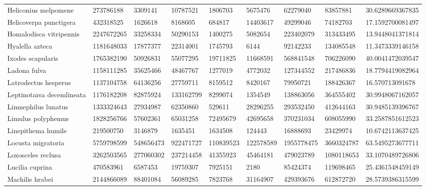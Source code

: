 \begin{table}[]
\begin{tabular}{@{}lllllllll@{}}
Heliconius melpomene       & 273786188   & 3309141   & 10787521  & 1806703   & 5675476   & 62279040   & 83857881   & 30.6289669367835  \\
Helicoverpa punctigera     & 432318525   & 1626618   & 8168605   & 684817    & 14403617  & 49299046   & 74182703   & 17.1592700081497  \\
Homalodisca vitripennis    & 2247672265  & 33258334  & 50290153  & 1400275   & 5082654   & 223402079  & 313433495  & 13.9448041371814  \\
Hyalella azteca            & 1181648033  & 17877377  & 22314001  & 1745793   & 6144      & 92142233   & 134085548  & 11.3473339146158  \\
Ixodes scapularis          & 1765382190  & 50926831  & 55077295  & 19711825  & 11668591  & 568841548  & 706226090  & 40.0041472039547  \\
Ladona fulva               & 1158111285  & 35625466  & 48467767  & 1277019   & 4772032   & 127344552  & 217486836  & 18.7794419082964  \\
Latrodectus hesperus       & 1137104758  & 64136256  & 27759711  & 8159512   & 8420167   & 79950721   & 188426367  & 16.570713091678   \\
Leptinotarsa decemlineata  & 1176182208  & 82875924  & 133162799 & 8299074   & 1354549   & 138863056  & 364555402  & 30.9948067162057  \\
Limnephilus lunatus        & 1333324643  & 27934987  & 62350860  & 529611    & 28296255  & 293532450  & 412644163  & 30.9485139396767  \\
Limulus polyphemus         & 1828256766  & 57602361  & 65031258  & 72495679  & 42695658  & 370231034  & 608055990  & 33.2587851612523  \\
Linepithema humile         & 219500750   & 3146879   & 1635451   & 1634508   & 124443    & 16888693   & 23429974   & 10.6742113637425  \\
Locusta migratoria         & 5759798599  & 548656473 & 922471727 & 110839523 & 122578589 & 1955778475 & 3660324787 & 63.5495273677711  \\
Loxosceles reclusa         & 3262503565  & 277060302 & 237214458 & 41355923  & 45464181  & 479023789  & 1080118653 & 33.1070489726806  \\
Lucilia cuprina            & 470583961   & 6587453   & 19759307  & 7925151   & 2180      & 85424374   & 119698465  & 25.4361548459149  \\
Machilis hrabei            & 2144866089  & 88401084  & 56089285  & 7823768   & 31164907  & 429393676  & 612872720  & 28.5739386315599  \\

\end{tabular}
\end{table}
